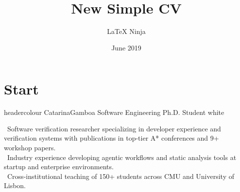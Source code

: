 \documentclass[lighthipster]{simplehipstercv}
\title{New Simple CV}
\author{\LaTeX{} Ninja}
\date{June 2019}
\begin{document}
\thispagestyle{plain}

\section*{Start}


\simpleheader
{headercolour}
{\hspace*{5cm}Catarina}{Gamboa}
{\hspace*{5cm}Software Engineering Ph.D. Student}
{white}
{\hspace*{5cm}
}
{\hspace*{5cm}

}
{
\hspace*{5cm}
\begin{minipage}[t]{0.7\textwidth}{
\vspace{-0.2cm}
\faBookmark~Software verification researcher specializing in developer experience and verification systems with publications in top-tier A* conferences and 9+ workshop papers.\\
\faGears~Industry experience developing agentic workflows and static analysis tools at startup and enterprise environments.\\
\faBook~Cross-institutional teaching of 150+ students across CMU and University of Lisbon.
}
\end{minipage}

}

\vspace*{-1.2cm}
\hspace*{-2cm}



\small
{}
\end{document}
